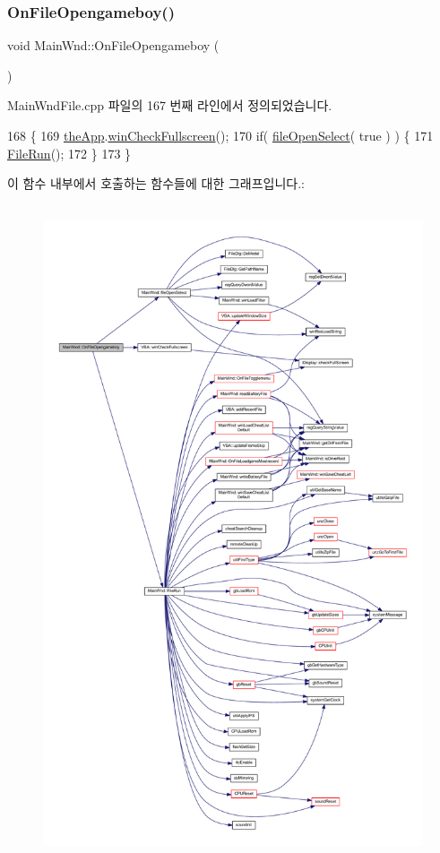 \subsubsection{\texorpdfstring{On\+File\+Opengameboy()}{OnFileOpengameboy()}}
{\footnotesize\ttfamily void Main\+Wnd\+::\+On\+File\+Opengameboy (\begin{DoxyParamCaption}{ }\end{DoxyParamCaption})\hspace{0.3cm}{\ttfamily [protected]}}



Main\+Wnd\+File.\+cpp 파일의 167 번째 라인에서 정의되었습니다.


\begin{DoxyCode}
168 \{
169     \mbox{\hyperlink{_v_b_a_8cpp_a8095a9d06b37a7efe3723f3218ad8fb3}{theApp}}.\mbox{\hyperlink{class_v_b_a_a340eaeeb7fcfc242f08ac3442d991a96}{winCheckFullscreen}}();
170     \textcolor{keywordflow}{if}( \mbox{\hyperlink{class_main_wnd_a872b497a88ca77012694cc909c62e6e4}{fileOpenSelect}}( \textcolor{keyword}{true} ) ) \{
171         \mbox{\hyperlink{class_main_wnd_a946cd4793215a424eb736af418ccbc3d}{FileRun}}();
172     \}
173 \}
\end{DoxyCode}
이 함수 내부에서 호출하는 함수들에 대한 그래프입니다.\+:
\nopagebreak
\begin{figure}[H]
\begin{center}
\leavevmode
\includegraphics[height=550pt]{class_main_wnd_ad1cfc9f500a8049610e1b7bc4c5ce725_cgraph}
\end{center}
\end{figure}
